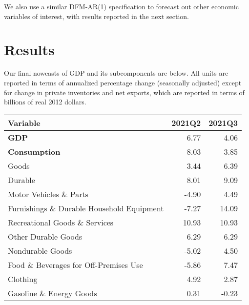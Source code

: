 \documentclass[11pt, letterpaper]{article}\usepackage[]{graphicx}\usepackage[]{color}
\begin{document}
We also use a similar DFM-AR(1) specification to forecast out other economic variables of interest, with results reported in the next section.


\section{Results}
Our final nowcasts of GDP and its subcomponents are below. All units are reported in terms of annualized percentage change (seasonally adjusted) except for change in private inventories and net exports, which are reported in terms of billions of real 2012 dollars.
\begin{table}[H]
\centering
\begingroup\fontsize{10pt}{12pt}\selectfont
\begin{tabular}{lrr}
  \hline
Variable & 2021Q2 & 2021Q3 \\ 
  \hline
\hspace{0mm} \textbf{GDP} & 6.77 & 4.06 \\ 
  \hspace{0mm} \textbf{Consumption} & 8.03 & 3.85 \\ 
  \hspace{8mm}  Goods & 3.44 & 6.39 \\ 
  \hspace{16mm}  Durable & 8.01 & 9.09 \\ 
  \hspace{24mm}  Motor Vehicles \& Parts & -4.90 & 4.49 \\ 
  \hspace{24mm}  Furnishings \& Durable Household Equipment & -7.27 & 14.09 \\ 
  \hspace{24mm}  Recreational Goods \& Services & 10.93 & 10.93 \\ 
  \hspace{24mm}  Other Durable Goods & 6.29 & 6.29 \\ 
  \hspace{16mm}  Nondurable Goods & -5.02 & 4.50 \\ 
  \hspace{24mm}  Food \& Beverages for Off-Premises Use & -5.86 & 7.47 \\ 
  \hspace{24mm}  Clothing & 4.92 & 2.87 \\ 
  \hspace{24mm}  Gasoline \& Energy Goods & 0.31 & -0.23 \\ 

\end{tabular}
\end{table}
\end{document}

